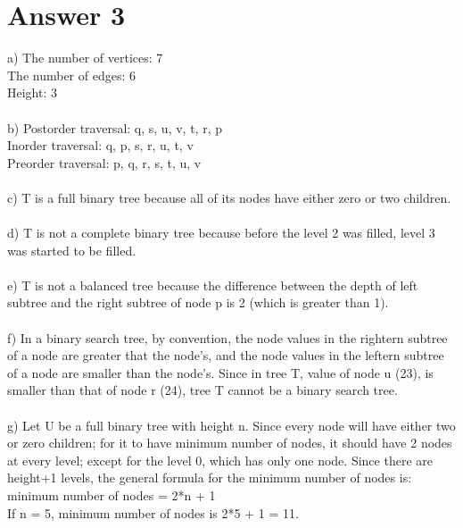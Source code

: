 \documentclass[12pt]{article}
\begin{document}
\section*{Answer 3}
a) The number of vertices: 7\\
The number of edges: 6\\
Height: 3\\\\
b) Postorder traversal: q, s, u, v, t, r, p\\
Inorder traversal: q, p, s, r, u, t, v\\
Preorder traversal: p, q, r, s, t, u, v\\\\
c) T is a full binary tree because all of its nodes have either zero or two children.\\\\
d) T is not a complete binary tree because before the level 2 was filled, level 3 was started to be filled.\\\\
e) T is not a balanced tree because the difference between the depth of left subtree and the right subtree of node p is 2 (which is greater than 1).\\\\
f) In a binary search tree, by convention, the node values in the rightern subtree of a node are greater that the node's, and the node values in the leftern subtree of a node are smaller than the node's. Since in tree T, value of node u (23), is smaller than that of node r (24), tree T cannot be a binary search tree.\\\\
g) Let U be a full binary tree with height n. Since every node will have either two or zero children; for it to have minimum number of nodes, it should have 2 nodes at every level; except for the level 0, which has only one node. Since there are height+1 levels, the general formula for the minimum number of nodes is:\\ minimum number of nodes = 2*n + 1\\
If n = 5, minimum number of nodes is 2*5 + 1 = 11.\\
\end{document}
